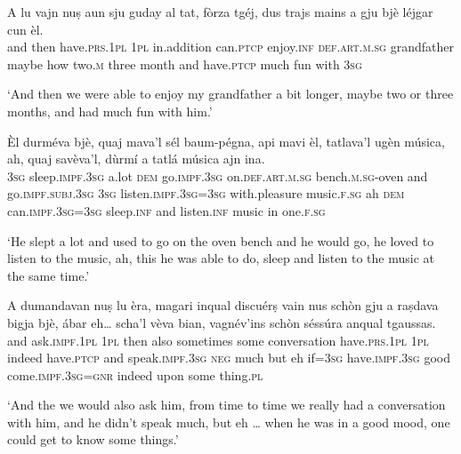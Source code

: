 \begin{linenumbers}
\gll  A lu vajn nuṣ aun sju guday al tat, fòrza tgéj, dus trajs mains a gju bjè léjgar cun èl.\\
and then have.\textsc{prs.1pl} \textsc{1pl} in.addition can.\textsc{ptcp} enjoy.\textsc{inf}  \textsc{def.art.m.sg} grandfather maybe how two.\textsc{m} three month and have.\textsc{ptcp} much fun with \textsc{3sg} \\
\end{linenumbers}
\medskip
\glt `And then we were able to enjoy my grandfather a bit longer, maybe two or three months, and had much fun with him.'
\medskip

\begin{linenumbers}
\gll  Èl durméva bjè, quaj mava'l sél baum-pégna, api mavi èl, tatlava'l ugèn música, ah, quaj savèva’l, dùrmí a tatlá música ajn ina.    \\ %
 \textsc{3sg} sleep.\textsc{impf.3sg} a.lot \textsc{dem} go.\textsc{impf.3sg} on.\textsc{def.art.m.sg} bench.\textsc{m.sg}-oven and go.\textsc{impf.subj.3sg} \textsc{3sg} listen.\textsc{impf.3sg}=\textsc{3sg} with.pleasure music.\textsc{f.sg} ah \textsc{dem} can.\textsc{impf.3sg=3sg} sleep.\textsc{inf} and listen.\textsc{inf} music in one.\textsc{f.sg}  \\
\end{linenumbers}
\medskip
\glt `He slept a lot and used to go on the oven bench and he would go, he loved to listen to the music, ah, this he was able to do, sleep and listen to the music at the same time.'
\medskip

\begin{linenumbers}
\gll  A dumandavan nuṣ lu èra, magari inqual discuérṣ vain nus schòn gju a raṣdava bigja bjè, ábar eh…  scha’l vèva bian, vagnév’ins schòn séssúra anqual tgaussas.  \\
and ask.\textsc{impf.1pl} \textsc{1pl} then also sometimes some conversation have.\textsc{prs.1pl} \textsc{1pl} indeed have.\textsc{ptcp} and  speak.\textsc{impf.3sg} \textsc{neg} much but eh if=\textsc{3sg}  have.\textsc{impf.3sg} good come.\textsc{impf.3sg=gnr} indeed upon some thing.\textsc{pl} \\
\end{linenumbers}
\medskip
\glt `And the we would also ask him, from time to time we really had a conversation with him, and he didn’t speak much, but eh … when he was in a good mood, one could get to know some things.'
\medskip


